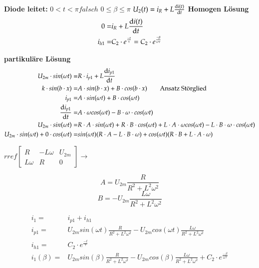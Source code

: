 \textbf{Diode leitet:} $ 0 < t < \pi falsch $ $ 0 \leq \beta \leq \pi $\newline
$U_2(t) = i_R + L\frac{\mathop{}\!\mathrm{d} i(t)}{\mathop{}\!\mathrm{d} t}$\newline
\textbf{Homogen Lösung}
\begin{align*}
     0 = & i_R + L \frac{\mathop{}\!\mathrm{d} i(t)}{\mathop{}\!\mathrm{d} t} \\
     i_{h1} = & C_2 \cdot e^{\frac{-t}{\tau}} = C_2 \cdot e^{\frac{-\beta}{\omega \tau}}
\end{align*} 

\textbf{partikuläre Lösung}
\begin{align*}
    U_{2m}\cdot sin(\omega t) = & R\cdot i_{p1} + L \frac{\mathop{}\!\mathrm{d} i_{p1}}{\mathop{}\!\mathrm{d} t}\\
    k \cdot sin(b \cdot x)= & A \cdot sin(b \cdot x) + B \cdot cos(b \cdot x) \qquad \text{Ansatz Störglied}\\
    i_{p1} = & A \cdot sin(\omega t) + B \cdot cos(\omega t)\\
    \frac{\mathop{}\!\mathrm{d} i_{p1}}{\mathop{}\!\mathrm{d} t} = & A \cdot \omega cos(\omega t) - B \cdot \omega \cdot cos(\omega t)\\
    U_{2m}\cdot sin(\omega t) = & R\cdot A \cdot sin(\omega t) + R\cdot B \cdot cos(\omega t)  + L\cdot A \cdot \omega cos(\omega t) - L\cdot B \cdot \omega \cdot cos(\omega t)\\
    U_{2m}\cdot sin(\omega t) + 0\cdot cos(\omega t) = & sin(\omega t)(R \cdot A - L \cdot B \cdot \omega) + cos(\omega t)(R\cdot B + L \cdot A \cdot \omega)
\end{align*}
\begin{minipage}{5cm}
    $rref
    \begin{bmatrix}
    R       &-L\omega  & U_{2m} \\ 
    L \omega&R         & 0
    \end{bmatrix} 
    \rightarrow$ 
\end{minipage}
\begin{minipage}{5cm}
    \[ A = U_{2m} \frac{R}{R^2 + L^2\omega^2} \]
    \[ B = -U_{2m} \frac{L\omega}{R^2 + L^2\omega^2} \]
\end{minipage}
\begin{align*}
    i_1 = & i_{p1} + i_{h1}\\
    i_{p1} = & U_{2m} sin(\omega t) \frac{R}{R^2 + L^2\omega^2} - U_{2m} cos(\omega t) \frac{L\omega}{R^2 + L^2\omega^2}\\
    i_{h1} = & C_2 \cdot e^{\frac{-t}{\tau}}\\
    i_{1}(\beta) = & U_{2m} sin(\beta) \frac{R}{R^2 + L^2\omega^2} - U_{2m} cos(\beta) \frac{L\omega}{R^2 + L^2\omega^2} + C_2 \cdot e^{\frac{-\beta}{\omega \tau}}
\end{align*}

